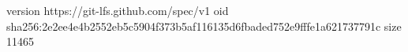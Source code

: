 version https://git-lfs.github.com/spec/v1
oid sha256:2e2ee4e4b2552eb5c5904f373b5af116135d6fbaded752e9fffe1a621737791c
size 11465
